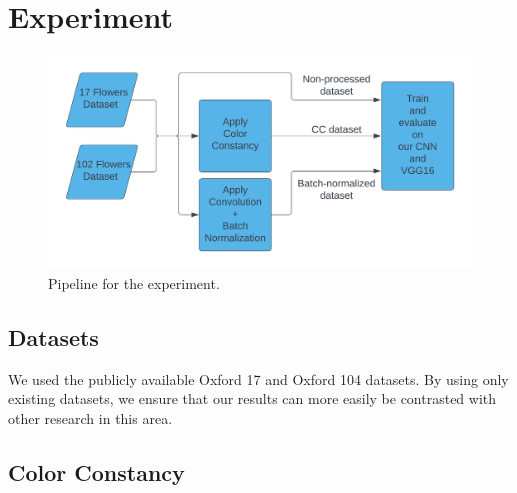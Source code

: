 

\section{Experiment}

\begin{figure}[ht]
    \centering
    \includegraphics[width=\textwidth]{images/experiment_pipeline.png}
    \caption{Pipeline for the experiment.}
    \label{fig:experiment_pipeline}
\end{figure}

\subsection{Datasets}

We used the publicly available Oxford 17 \cite{Nilsback06} and Oxford 104 \cite{Nilsback08} datasets. By using only existing datasets, we ensure that our results can more
easily be contrasted with other research in this area.

\subsection{Color Constancy}


